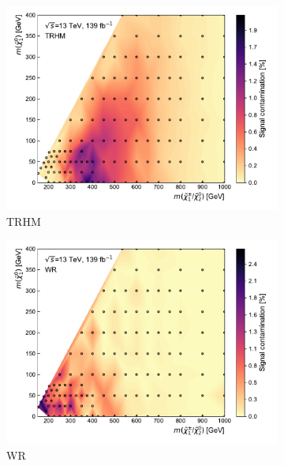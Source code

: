 \begin{figure}
\begin{subfigure}[b]{0.5\linewidth}
		\centering\includegraphics[width=1.0\textwidth]{signal_contamination/plot_TRHM}
		\caption{TRHM\label{fig:signal_contamination_TRHM}}
	\end{subfigure}\hfill
	\begin{subfigure}[b]{0.5\linewidth}
		\centering\includegraphics[width=1.0\textwidth]{signal_contamination/plot_WR}
		\caption{WR\label{fig:signal_contamination_WR}}
	\end{subfigure}\hfill
	\begin{subfigure}[b]{0.5\linewidth}

\end{subfigure}
\end{figure}
